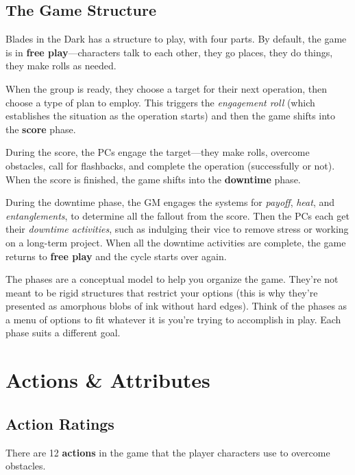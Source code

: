 \subsection{The Game Structure}

Blades in the Dark has a structure to play, with four parts. By default, the game is in \textbf{free play}—characters talk to each other, they go places, they do things, they make rolls as needed.

When the group is ready, they choose a target for their next operation, then choose a type of plan to employ. This triggers the \emph{engagement roll} (which establishes the situation as the operation starts) and then the game shifts into the \textbf{score} phase.

During the score, the PCs engage the target—they make rolls, overcome obstacles, call for flashbacks, and complete the operation (successfully or not). When the score is finished, the game shifts into the \textbf{downtime} phase.

During the downtime phase, the GM engages the systems for \emph{payoff}, \emph{heat}, and \emph{entanglements}, to determine all the fallout from the score. Then the PCs each get their \emph{downtime activities}, such as indulging their vice to remove stress or working on a long-term project. When all the downtime activities are complete, the game returns to \textbf{free play} and the cycle starts over again.

The phases are a conceptual model to help you organize the game. They’re not meant to be rigid structures that restrict your options (this is why they’re presented as amorphous blobs of ink without hard edges). Think of the phases as a menu of options to fit whatever it is you’re trying to accomplish in play. Each phase suits a different goal.

\section{Actions \& Attributes}

\subsection{Action Ratings}

There are 12 \textbf{actions} in the game that the player characters use to overcome obstacles.

\begin{item3}
\item {}
\item {}
\item {}
\item {}
\item {}
\item {}
\item {}
\item {}
\item {}
\item {}
\item {}
\item {}
\end{item3}

